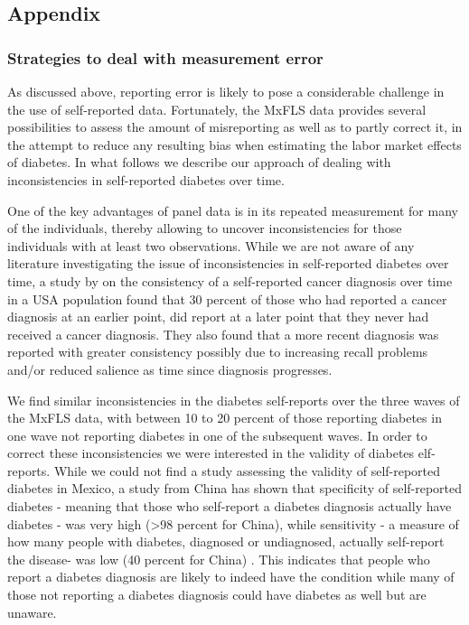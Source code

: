 \documentclass[12pt,english,british]{article}
\begin{document}
\begin{appendix}
\clearpage


\part*{Appendix}

\section{Strategies to deal with measurement error}

As discussed above, reporting error is likely to pose a considerable
challenge in the use of self-reported data. Fortunately, the \ac{MxFLS}
data provides several possibilities to assess the amount of misreporting
as well as to partly correct it, in the attempt to reduce any resulting
bias when estimating the labor market effects of diabetes. In what
follows we describe our approach of dealing with inconsistencies in
self-reported diabetes over time.

One of the key advantages of panel data is in its repeated measurement
for many of the individuals, thereby allowing to uncover inconsistencies
for those individuals with at least two observations. While we are
not aware of any literature investigating the issue of inconsistencies
in self-reported diabetes over time, a study by \citet{Zajacova2010}
on the consistency of a self-reported cancer diagnosis over time in
a USA population found that 30 percent of those who had reported a
cancer diagnosis at an earlier point, did report at a later point
that they never had received a cancer diagnosis. They also found that
a more recent diagnosis was reported with greater consistency possibly
due to increasing recall problems and/or reduced salience as time
since diagnosis progresses.

We find similar inconsistencies in the diabetes self-reports over
the three waves of the \ac{MxFLS} data, with between 10 to 20 percent
of those reporting diabetes in one wave not reporting diabetes in
one of the subsequent waves. In order to correct these inconsistencies we were interested in the validity of diabetes elf-reports. While we could not find a study assessing
the validity of self-reported diabetes in Mexico, a study from China
has shown that specificity of self-reported diabetes - meaning that
those who self-report a diabetes diagnosis actually have diabetes
- was very high (>98 percent for China), while sensitivity - a measure
of how many people with diabetes, diagnosed or undiagnosed, actually
self-report the disease- was low (40 percent for China) \citep{Yuan2015}.
This indicates that people who report a diabetes diagnosis are likely
to indeed have the condition while many of those not reporting
a diabetes diagnosis could have diabetes as well but are unaware.


\end{appendix}
\end{document}
